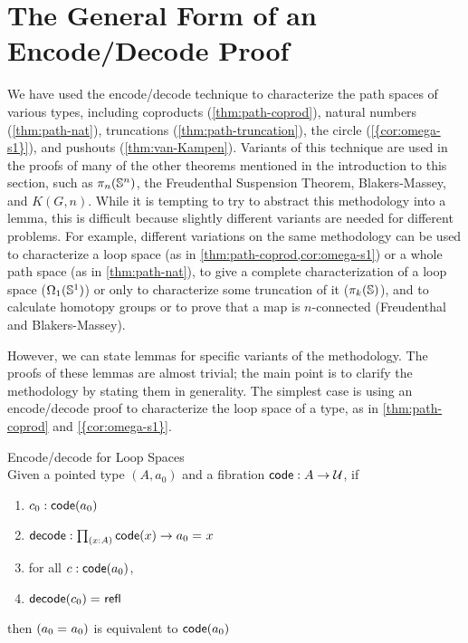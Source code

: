 \section{The General Form of an Encode/Decode Proof}
\label{sec:general-encode-decode}

We have used the encode/decode technique to characterize the path spaces
of various types, including coproducts (\cref{thm:path-coprod}), natural
numbers (\cref{thm:path-nat}), truncations (\cref{thm:path-truncation}),
the circle (\cref{{cor:omega-s1}}), and pushouts
(\cref{thm:van-Kampen}).  Variants of this technique are used in the
proofs of many of the other theorems mentioned in the introduction to
this section, such as $\pi_n(\mathbb{S}^n)$, the Freudenthal Suspension
Theorem, Blakers-Massey, and $K(G,n)$.  While it is tempting to try to
abstract this methodology into a lemma, this is difficult because
slightly different variants are needed for different problems.  For
example, different variations on the same methodology can be used to
characterize a loop space (as in \cref{thm:path-coprod,cor:omega-s1}) or
a whole path space (as in \cref{thm:path-nat}), to give a complete
characterization of a loop space ($\Omega_1(\mathbb{S} ^1)$) or only to
characterize some truncation of it ($\pi_k(\mathbb{S})$), and to calculate
homotopy groups or to prove that a map is $n$-connected (Freudenthal and
Blakers-Massey).

However, we can state lemmas for specific variants of the methodology.
The proofs of these lemmas are almost trivial; the main point is to
clarify the methodology by stating them in generality.  The simplest
case is using an encode/decode proof to characterize the loop space of a
type, as in \cref{thm:path-coprod} and \cref{{cor:omega-s1}}.

\begin{lem}{Encode/decode for Loop Spaces} \\
Given a pointed type $(A,a_0)$ and a fibration
$\mathsf{code} : A \to \mathcal{U}$, if 
\begin{enumerate}
\item $c_0 : \mathsf{code}(a_0)$
\item $\decode : \prd{x:A} \code(x) \to \id{a_0}{x}$
\item for all $c : \mathsf{code}(a_0)$, 
\item $\mathsf{decode}(c_0) =_{} \mathsf{refl}_{}$
\end{enumerate}
then $(a_0 =_{} a_0)$ is equivalent to $\mathsf{code}(a_0)$
\end{lem}

